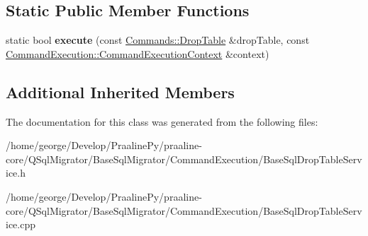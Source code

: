 \subsection*{Static Public Member Functions}
\begin{DoxyCompactItemize}
\item 
\mbox{\label{class_q_sql_migrator_1_1_command_execution_1_1_base_sql_drop_table_service_a8e48525f31a24f959cb38bfa612ab65b}} 
static bool {\bfseries execute} (const \hyperlink{class_q_sql_migrator_1_1_commands_1_1_drop_table}{Commands\+::\+Drop\+Table} \&drop\+Table, const \hyperlink{class_q_sql_migrator_1_1_command_execution_1_1_command_execution_context}{Command\+Execution\+::\+Command\+Execution\+Context} \&context)
\end{DoxyCompactItemize}
\subsection*{Additional Inherited Members}


The documentation for this class was generated from the following files\+:\begin{DoxyCompactItemize}
\item 
/home/george/\+Develop/\+Praaline\+Py/praaline-\/core/\+Q\+Sql\+Migrator/\+Base\+Sql\+Migrator/\+Command\+Execution/Base\+Sql\+Drop\+Table\+Service.\+h\item 
/home/george/\+Develop/\+Praaline\+Py/praaline-\/core/\+Q\+Sql\+Migrator/\+Base\+Sql\+Migrator/\+Command\+Execution/Base\+Sql\+Drop\+Table\+Service.\+cpp\end{DoxyCompactItemize}
